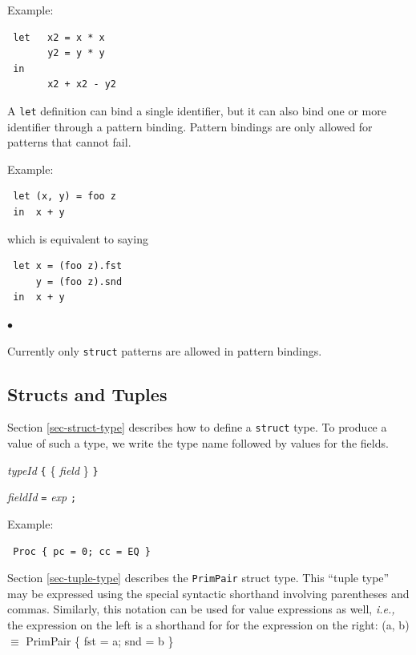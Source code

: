 \documentclass[twoside,letterpaper]{article}
\newcommand{\hm}{\hspace*{1em}}
\newcommand{\hmm}{\hspace*{2em}}
\newcommand{\ie}{\emph{i.e.,}}
\newenvironment{NOTE}{%
  \hm{\bf{Note}}
  \begin{list}{$\bullet$}{%
    \setlength{\topsep}{0in}
    \setlength{\partopsep}{0in}
    \setlength{\itemsep}{0in}
    \setlength{\parsep}{0in}
    \setlength{\leftmargin}{2em}
    \setlength{\rightmargin}{0in}
    \setlength{\itemindent}{0in}
  }\item[]
  \sf
 }
 {\end{list}\hm{\bf{End of Note}}}
\newcommand{\te}[1]{\texttt{#1}}
\newcommand{\nterm}[1]{\emph{#1}}
\newcommand{\term}[1]{{\tt{#1}}}
\newcommand{\many}[1]{\{ #1 \}}
\newcommand{\gram}[2]{    \hm\makebox[10em][l]{\it #1}\makebox[1.5em][l]{::=}    #2}
\begin{document}
Example:
\begin{verbatim}
 let   x2 = x * x
       y2 = y * y
 in
       x2 + x2 - y2
\end{verbatim}

A \te{let} definition can bind a single identifier, but it can also
bind one or more identifier through a pattern binding.  Pattern
bindings are only allowed for patterns that cannot fail.

Example:
\begin{verbatim}
 let (x, y) = foo z
 in  x + y
\end{verbatim}
which is equivalent to saying
\begin{verbatim}
 let x = (foo z).fst
     y = (foo z).snd
 in  x + y
\end{verbatim}

\begin{NOTE}
Currently only \te{struct} patterns are allowed in pattern bindings.
\end{NOTE}


\subsection{Structs and Tuples}

\label{sec-struct-val}

Section {\ref{sec-struct-type}} describes how to define a
{\te{struct}} type.  To produce a value of such a type, we write the
type name followed by values for the fields.

\gram{aexp}{\nterm{typeId} \term{\{} \many{\nterm{field}} \term{\}}}

\gram{field}{\nterm{fieldId} \term{=} \nterm{exp} \term{;}}

Example:
\begin{verbatim}
 Proc { pc = 0; cc = EQ }
\end{verbatim}

Section {\ref{sec-tuple-type}} describes the {\te{PrimPair}} struct
type.  This ``tuple type'' may be expressed using the special
syntactic shorthand involving parentheses and commas.  Similarly, this
notation can be used for value expressions as well, {\ie} the
expression on the left is a shorthand for for the expression on the
right:
\BBS
(a, b)  \hmm  $\equiv$  \hmm  PrimPair \{ fst = a; snd = b \}
\EBS

\end{document}
